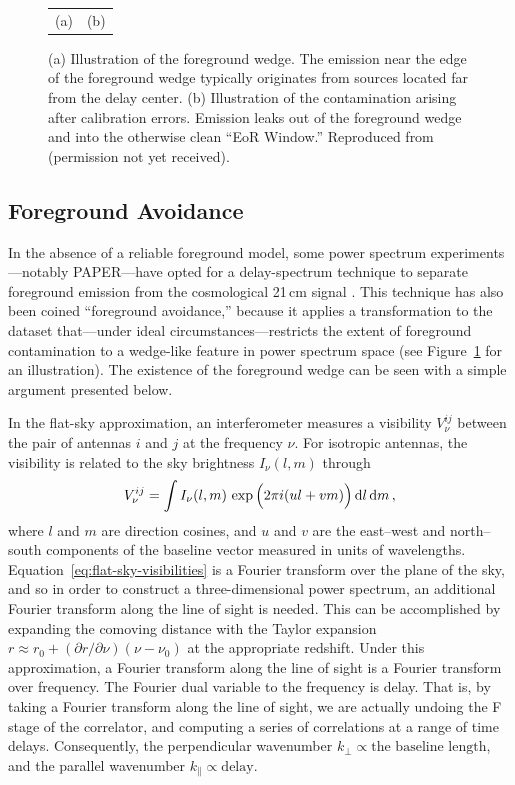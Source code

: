 \begin{bibunit}
\begin{figure}
\begin{tabular}{cc}
        (a) & (b) \\
    \end{tabular}
    \caption{
        (a) Illustration of the foreground wedge. The emission near the edge of the foreground wedge
        typically originates from sources located far from the delay center.
        (b) Illustration of the contamination arising after calibration errors. Emission leaks out
        of the foreground wedge and into the otherwise clean ``EoR Window.''
        Reproduced from \citet{2012ApJ...752..137M} (permission not yet received).
    }
    \label{fig:morales-foreground-wedge}
\end{figure}

\subsection{Foreground Avoidance}

In the absence of a reliable foreground model, some power spectrum experiments---notably
PAPER---have opted for a delay-spectrum technique to separate foreground emission from the
cosmological 21\,cm signal \citep{2012ApJ...756..165P}. This technique has also been coined
``foreground avoidance,'' because it applies a transformation to the dataset that---under ideal
circumstances---restricts the extent of foreground contamination to a wedge-like feature in power
spectrum space (see Figure~\ref{fig:morales-foreground-wedge} for an illustration). The existence of
the foreground wedge can be seen with a simple argument presented below.

In the flat-sky approximation, an interferometer measures a visibility $V^{ij}_\nu$ between the
pair of antennas $i$ and $j$ at the frequency $\nu$. For isotropic antennas, the visibility is
related to the sky brightness $I_\nu(l, m)$ through
\begin{equation}\label{eq:flat-sky-visibilities}
    V^{ij}_\nu = \int I_\nu(l, m)\,\exp\Big(2\pi i (ul + vm)\Big)\,{\textrm d} l\,{\textrm d} m\,,
\end{equation}
where $l$ and $m$ are direction cosines, and $u$ and $v$ are the east--west and north--south
components of the baseline vector measured in units of wavelengths.
Equation~\ref{eq:flat-sky-visibilities} is a Fourier transform over the plane of the sky, and so in
order to construct a three-dimensional power spectrum, an additional Fourier transform along the
line of sight is needed. This can be accomplished by expanding the comoving distance with the Taylor
expansion $r \approx r_0 + (\partial r/\partial \nu)(\nu - \nu_0)$ at the appropriate redshift.
Under this approximation, a Fourier transform along the line of sight is a Fourier transform over
frequency.  The Fourier dual variable to the frequency is delay. That is, by taking a Fourier
transform along the line of sight, we are actually undoing the F stage of the correlator, and
computing a series of correlations at a range of time delays.  Consequently, the perpendicular
wavenumber $k_\perp \propto \text{the baseline length}$, and the parallel wavenumber $k_\parallel
\propto \text{delay}$.


\end{bibunit}
